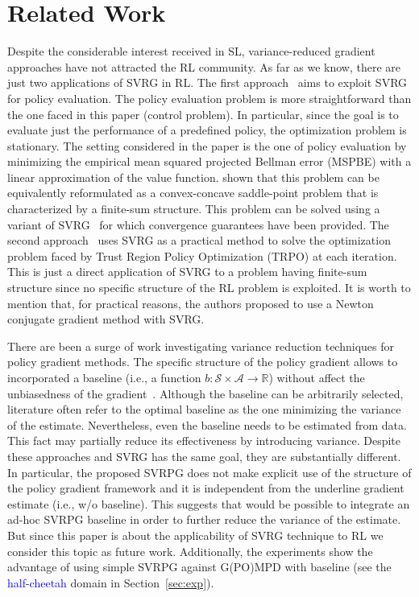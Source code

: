 \documentclass{article}
\makeatletter
\theoremstyle{remark}
\theoremstyle{definition}
\DeclareRobustCommand{\eg}{e.g.,\@\xspace}
\DeclareRobustCommand{\ie}{i.e.,\@\xspace}
\newcommand{\realspace}{\mathbb R}      %
\makeatother
\begin{document}
\section{Related Work}
Despite the considerable interest received in SL, variance-reduced gradient approaches have not attracted the RL community.
As far as we know, there are just two applications of SVRG in RL.
The first approach~\citep{du2017svrgpe} aims to exploit SVRG for policy evaluation.
The policy evaluation problem is more straightforward than the one faced in this paper (control problem).
In particular, since the goal is to evaluate just the performance of a predefined policy, the optimization problem is stationary.
The setting considered in the paper is the one of policy evaluation by minimizing the empirical mean squared projected Bellman error (MSPBE) with a linear approximation of the value function. \citet{du2017svrgpe} shown that this problem can be equivalently reformulated as a convex-concave saddle-point problem that is characterized by a finite-sum structure.
This problem can be solved using a variant of SVRG~\citep{Palaniappan2016svrgsaddle} for which convergence guarantees have been provided.
The second approach~\citep{xu2017svrgtrpo} uses SVRG as a practical method to solve the optimization problem faced by Trust Region Policy Optimization (TRPO) at each iteration. This is just a direct application of SVRG to a problem having finite-sum structure since no specific structure of the RL problem is exploited.
It is worth to mention that, for practical reasons, the authors proposed to use a Newton conjugate gradient method with SVRG.

There are been a surge of work investigating variance reduction techniques for policy gradient methods.
The specific structure of the policy gradient allows to incorporated a baseline (\ie a function $b :\mathcal{S}\times\mathcal{A} \to \realspace$) without affect the unbiasedness of the gradient~\citep[\eg][]{williams1992simple,weaver2001optimal,peters2008reinforcement,Thomas2017actionbaseline,wu2018variance}.
Although the baseline can be arbitrarily selected, literature often refer to the optimal baseline as the one minimizing the variance of the estimate.
Nevertheless, even the baseline needs to be estimated from data. This fact may partially reduce its effectiveness by introducing variance.
Despite these approaches and SVRG has the same goal, they are substantially different.
In particular, the proposed SVRPG does not make explicit use of the structure of the policy gradient framework and it is independent from the underline gradient estimate (\ie w/o baseline).
This suggests that would be possible to integrate an ad-hoc SVRPG baseline in order to further reduce the variance of the estimate.
But since this paper is about the applicability of SVRG technique to RL we consider this topic as future work.
Additionally, the experiments show the advantage of using simple SVRPG against G(PO)MPD with baseline (see the \textcolor{blue}{half-cheetah} domain in Section~\ref{sec:exp}).
\end{document}
